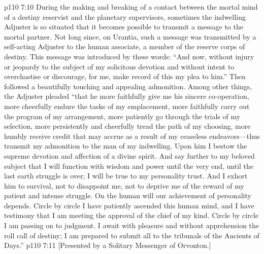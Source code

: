\pc \vs p110 7:10 During the making and breaking of a contact between the mortal mind of a destiny reservist and the planetary supervisors, sometimes the indwelling Adjuster is so situated that it becomes possible to transmit a message to the mortal partner. Not long since, on Urantia, such a message was transmitted by a self\hyp{}acting Adjuster to the human associate, a member of the reserve corps of destiny. This message was introduced by these words: “And now, without injury or jeopardy to the subject of my solicitous devotion and without intent to overchastise or discourage, for me, make record of this my plea to him.” Then followed a beautifully touching and appealing admonition. Among other things, the Adjuster pleaded “that he more faithfully give me his sincere co\hyp{}operation, more cheerfully endure the tasks of my emplacement, more faithfully carry out the program of my arrangement, more patiently go through the trials of my selection, more persistently and cheerfully tread the path of my choosing, more humbly receive credit that may accrue as a result of my ceaseless endeavors---thus transmit my admonition to the man of my indwelling. Upon him I bestow the supreme devotion and affection of a divine spirit. And say further to my beloved subject that I will function with wisdom and power until the very end, until the last earth struggle is over; I will be true to my personality trust. And I exhort him to survival, not to disappoint me, not to deprive me of the reward of my patient and intense struggle. On the human will our achievement of personality depends. Circle by circle I have patiently ascended this human mind, and I have testimony that I am meeting the approval of the chief of my kind. Circle by circle I am passing on to judgment. I await with pleasure and without apprehension the roll call of destiny; I am prepared to submit all to the tribunals of the Ancients of Days.”\plusone
\vsetoff
\vs p110 7:11 [Presented by a Solitary Messenger of Orvonton.]
